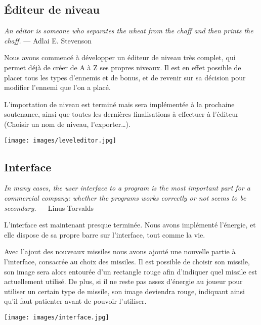 \documentclass[12pt,a4paper]{article}
\begin{document}
\subsection{Éditeur de niveau}
\par \emph{An editor is someone who separates the wheat from the chaff and then prints the chaff.} ---   Adlai E. Stevenson
\vspace{0.8cm}

\par Nous avons commencé à développer un éditeur de niveau très complet, qui permet déjà de créer de A à Z ses propres niveaux. Il est en effet possible de placer tous les types d'ennemis et de bonus, et de revenir sur sa décision pour modifier l'ennemi que l'on a placé.

\par L'importation de niveau est terminé mais sera implémentée à la prochaine soutenance,
ainsi que toutes les dernières finalisations à effectuer à l'éditeur (Choisir un nom de niveau, l'exporter\ldots).

\begin{center}
\texttt{[image: images/leveleditor.jpg]}
\end{center}

\subsection{Interface}
\par \emph{In many cases, the user interface to a program is the most important part for a commercial company: whether the programs works correctly or not seems to be secondary.} ---  Linus Torvalds
\vspace{0.8cm}
\par L'interface est maintenant presque terminée.
Nous avons implémenté l'énergie, et elle dispose de sa propre barre sur l'interface, tout comme la vie.

\par Avec l'ajout des nouveaux missiles nous avons ajouté une nouvelle partie à l'interface, consacrée au choix des missiles.
Il est possible de choisir son missile, son image sera alors entourée d'un rectangle rouge afin d'indiquer quel missile est actuellement utilisé.
De plus, si il ne reste pas assez d'énergie au joueur pour utiliser un certain type de missile, son image deviendra rouge, indiquant ainsi qu'il faut patienter avant de pouvoir l'utiliser.

\texttt{[image: images/interface.jpg]}
\end{document}
